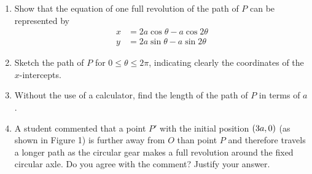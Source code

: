 \documentclass{echw}
\begin{document}
        \begin{enumerate}
            \item Show that the equation of one full revolution of the path of $P$ can be represented by
            \begin{align*}
                x &= 2a\cos\theta - a\cos2\theta\\
                y &= 2a\sin\theta - a\sin2\theta
            \end{align*}
            \item Sketch the path of $P$ for $0 \leq \theta \leq 2\pi$, indicating clearly the coordinates of the $x$-intercepts.
            \item Without the use of a calculator, find the length of the path of $P$ in terms of $a$.
            \item A student commented that a point $P'$ with the initial position $\left(3a, 0\right)$ (as shown in Figure 1) is further away from $O$ than point $P$ and therefore travels a longer path as the circular gear makes a full revolution around the fixed circular axle. Do you agree with the comment? Justify your answer.
        \end{enumerate}

    \solution
\end{document}
